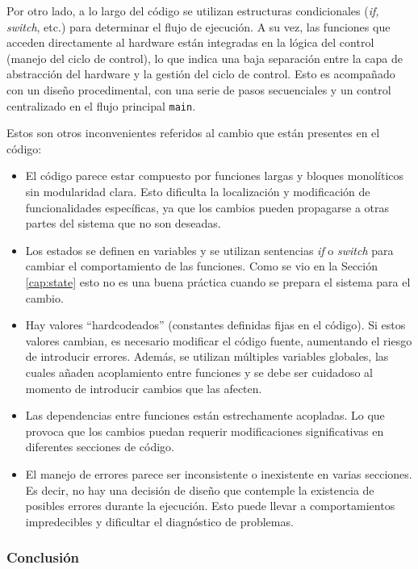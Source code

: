 Por otro lado, a lo largo del código se utilizan estructuras condicionales (\textit{if, switch}, etc.) para determinar el flujo de ejecución. A su vez, las funciones que acceden directamente al hardware están integradas en la lógica del control (manejo del ciclo de control), lo que indica una baja separación entre la capa de abstracción del hardware y la gestión del ciclo de control. Esto es acompañado con un diseño procedimental, con una serie de pasos secuenciales y un control centralizado en el flujo principal \verb|main|.

Estos son otros inconvenientes referidos al cambio que están presentes en el código:
\begin{itemize}
\item El código parece estar compuesto por funciones largas y bloques monolíticos sin modularidad clara. Esto dificulta la localización y modificación de funcionalidades específicas, ya que los cambios pueden propagarse a otras partes del sistema que no son deseadas.
\item Los estados se definen en variables y se utilizan sentencias \textit{if} o \textit{switch} para cambiar el comportamiento de las funciones. Como se vio en la Sección \ref{cap:state} esto no es una buena práctica cuando se prepara el sistema para el cambio.
\item Hay valores ``hardcodeados'' (constantes definidas fijas en el código). Si estos valores cambian, es necesario modificar el código fuente, aumentando el riesgo de introducir errores. Además, se utilizan múltiples variables globales, las cuales añaden acoplamiento entre funciones y se debe ser cuidadoso al momento de introducir cambios que las afecten.
\item Las dependencias entre funciones están estrechamente acopladas. Lo que provoca que los cambios puedan requerir modificaciones significativas en diferentes secciones de código.
\item El manejo de errores parece ser inconsistente o inexistente en varias secciones. Es decir, no hay una decisión de diseño que contemple la existencia de posibles errores durante la ejecución. Esto puede llevar a comportamientos impredecibles y dificultar el diagnóstico de problemas.
\end{itemize}

\subsubsection*{Conclusión}

